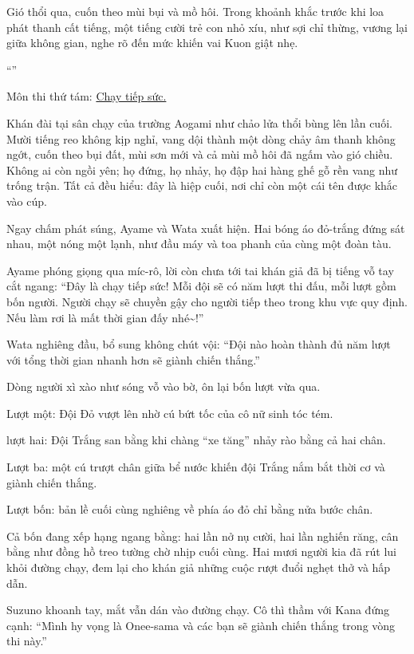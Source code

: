 \documentclass[../main.tex]{subfiles}
\begin{document}
Gió thổi qua, cuốn theo mùi bụi và mồ hôi. Trong khoảnh khắc trước khi loa phát thanh cất tiếng, một tiếng cười trẻ con nhỏ xíu, như sợi chỉ thừng, vương lại giữa không gian, nghe rõ đến mức khiến vai Kuon giật nhẹ.

``''

\begin{center}
  {\color{vol} Môn thi thứ tám: \uline{Chạy tiếp sức.}}
\end{center}

Khán đài tại sân chạy của trường Aogami như chảo lửa thổi bùng lên lần cuối. Mười tiếng reo không kịp nghỉ, vang dội thành một dòng chảy âm thanh không ngớt, cuốn theo bụi đất, mùi sơn mới và cả mùi mồ hôi đã ngấm vào gió chiều. Không ai còn ngồi yên; họ đứng, họ nhảy, họ đập hai hàng ghế gỗ rền vang như trống trận. Tất cả đều hiểu: đây là hiệp cuối, nơi chỉ còn một cái tên được khắc vào cúp.

Ngay chấm phát súng, Ayame và Wata xuất hiện. Hai bóng áo đỏ-trắng đứng sát nhau, một nóng một lạnh, như đầu máy và toa phanh của cùng một đoàn tàu.

Ayame phóng giọng qua míc-rô, lời còn chưa tới tai khán giả đã bị tiếng vỗ tay cắt ngang: ``Đây là chạy tiếp sức! Mỗi đội sẽ có năm lượt thi đấu, mỗi lượt gồm bốn người. Người chạy sẽ chuyền gậy cho người tiếp theo trong khu vực quy định. Nếu làm rơi là mất thời gian đấy nhé\~{}!''

Wata nghiêng đầu, bổ sung không chút vội: ``Đội nào hoàn thành đủ năm lượt với tổng thời gian nhanh hơn sẽ giành chiến thắng.''

Dòng người xì xào như sóng vỗ vào bờ, ôn lại bốn lượt vừa qua.

Lượt một: Đội Đỏ vượt lên nhờ cú bứt tốc của cô nữ sinh tóc tém.

lượt hai: Đội Trắng san bằng khi chàng ``xe tăng'' nhảy rào bằng cả hai chân.

Lượt ba: một cú trượt chân giữa bể nước khiến đội Trắng nắm bắt thời cơ và giành chiến thắng.

Lượt bốn: bản lề cuối cùng nghiêng về phía áo đỏ chỉ bằng nửa bước chân.

Cả bốn đang xếp hạng ngang bằng: hai lần nở nụ cười, hai lần nghiến răng, cân bằng như đồng hồ treo tường chờ nhịp cuối cùng. Hai mươi người kia đã rút lui khỏi đường chạy, đem lại cho khán giả những cuộc rượt đuổi nghẹt thở và hấp dẫn.

Suzuno khoanh tay, mắt vẫn dán vào đường chạy. Cô thì thầm với Kana đứng cạnh: ``Mình hy vọng là Onee-sama và các bạn sẽ giành chiến thắng trong vòng thi này.''
\end{document}
